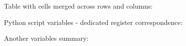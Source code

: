 Table with cells merged
across rows and columns:
    

\noindent 
Python script variables -
dedicated register
correspondence:
    
    
\noindent 
Another variables summary:
    